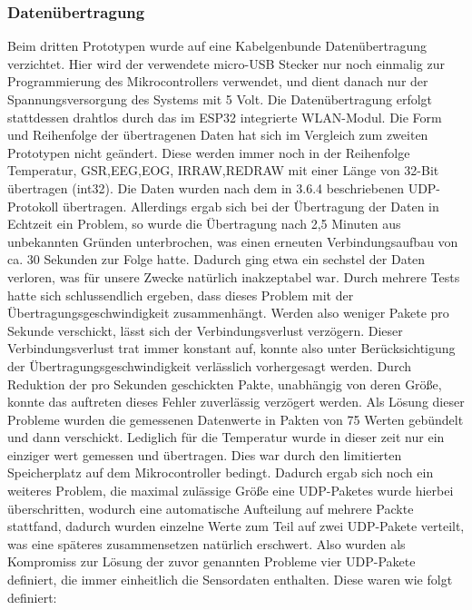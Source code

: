 \subsubsection{Daten{\"u}bertragung} \label{datenuebertragung-subsubsec}

Beim dritten Prototypen wurde auf eine Kabelgenbunde Datenübertragung verzichtet. Hier wird der verwendete micro-USB Stecker nur noch einmalig zur Programmierung des Mikrocontrollers verwendet, und dient danach nur der Spannungsversorgung des Systems mit 5 Volt. Die Datenübertragung erfolgt stattdessen drahtlos durch das im ESP32 integrierte WLAN-Modul. Die Form und Reihenfolge der übertragenen Daten hat sich im Vergleich zum zweiten Prototypen nicht geändert. Diese werden immer noch in der Reihenfolge Temperatur, GSR,EEG,EOG, IRRAW,REDRAW mit einer Länge von 32-Bit übertragen (int32). Die Daten wurden nach dem in 3.6.4 beschriebenen UDP-Protokoll übertragen. Allerdings ergab sich bei der Übertragung der Daten in Echtzeit ein Problem, so wurde die Übertragung nach 2,5 Minuten aus unbekannten Gründen unterbrochen, was einen erneuten Verbindungsaufbau von ca. 30 Sekunden zur Folge hatte. Dadurch ging etwa ein sechstel der Daten verloren, was für unsere Zwecke natürlich inakzeptabel war. Durch mehrere Tests hatte sich schlussendlich ergeben, dass dieses Problem mit der Übertragungsgeschwindigkeit zusammenhängt. Werden also weniger Pakete pro Sekunde verschickt, lässt sich der Verbindungsverlust verzögern. Dieser Verbindungsverlust trat immer konstant auf, konnte also unter Berücksichtigung der Übertragungsgeschwindigkeit verlässlich vorhergesagt werden. Durch Reduktion der pro Sekunden geschickten Pakte, unabhängig von deren Größe,  konnte das auftreten dieses Fehler zuverlässig verzögert werden. Als Lösung dieser Probleme wurden die gemessenen Datenwerte in Pakten von 75 Werten gebündelt und dann verschickt. Lediglich für die Temperatur wurde in dieser zeit nur ein einziger wert gemessen und übertragen. Dies war durch den limitierten Speicherplatz auf dem Mikrocontroller bedingt. Dadurch ergab sich noch ein weiteres Problem, die maximal zulässige Größe eine UDP-Paketes wurde hierbei überschritten, wodurch eine automatische Aufteilung auf mehrere Packte stattfand, dadurch  
wurden einzelne Werte zum Teil auf zwei UDP-Pakete verteilt, was eine späteres zusammensetzen natürlich erschwert. Also wurden als Kompromiss zur Lösung der zuvor genannten Probleme vier UDP-Pakete definiert, die immer einheitlich die Sensordaten enthalten. Diese waren wie folgt definiert:







